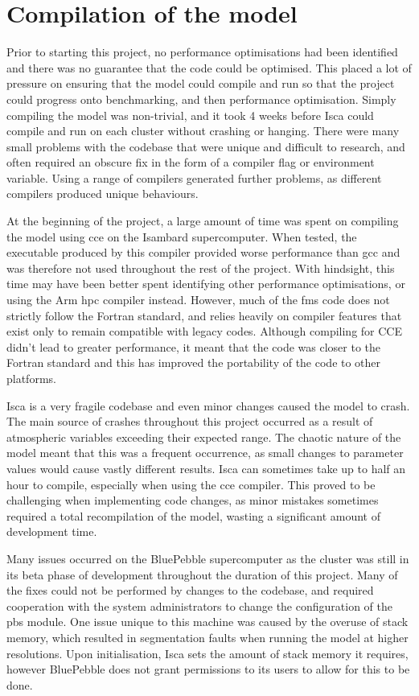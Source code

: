 \documentclass[a4paper,11pt]{report}
\begin{document}
\section{Compilation of the model}
Prior to starting this project, no performance optimisations had been identified and there was no guarantee that the code could be optimised. This placed a lot of pressure on ensuring that the model could compile and run so that the project could progress onto benchmarking, and then performance optimisation. Simply compiling the model was non-trivial, and it took 4 weeks before Isca could compile and run on each cluster without crashing or hanging. There were many small problems with the codebase that were unique and difficult to research, and often required an obscure fix in the form of a compiler flag or environment variable. Using a range of compilers generated further problems, as different compilers produced unique behaviours.
\par
At the beginning of the project, a large amount of time was spent on compiling the model using \gls{cce} on the Isambard supercomputer. When tested, the executable produced by this compiler provided worse performance than \gls{gcc} and was therefore not used throughout the rest of the project. With hindsight, this time may have been better spent identifying other performance optimisations, or using the Arm \gls{hpc} compiler instead. However, much of the \gls{fms} code does not strictly follow the Fortran standard, and relies heavily on compiler features that exist only to remain compatible with legacy codes. Although compiling for CCE didn't lead to greater performance, it meant that the code was closer to the Fortran standard and this has improved the portability of the code to other platforms. 
\par
Isca is a very fragile codebase and even minor changes caused the model to crash. The main source of crashes throughout this project occurred as a result of atmospheric variables exceeding their expected range. The chaotic nature of the model meant that this was a frequent occurrence, as small changes to parameter values would cause vastly different results. Isca can sometimes take up to half an hour to compile, especially when using the \gls{cce}
compiler. This proved to be challenging when implementing code changes, as minor mistakes sometimes required a total recompilation of the model, wasting a significant amount of development time. 
\par
Many issues occurred on the BluePebble supercomputer as the cluster was still in its beta phase of development throughout the duration of this project. Many of the fixes could not be performed by changes to the codebase, and required cooperation with the system administrators to change the configuration of the \gls{pbs} module. One issue unique to this machine was caused by the overuse of stack memory, which resulted in segmentation faults when running the model at higher resolutions. Upon initialisation, Isca sets the amount of stack memory it requires, however BluePebble does not grant permissions to its users to allow for this to be done.
\end{document}
